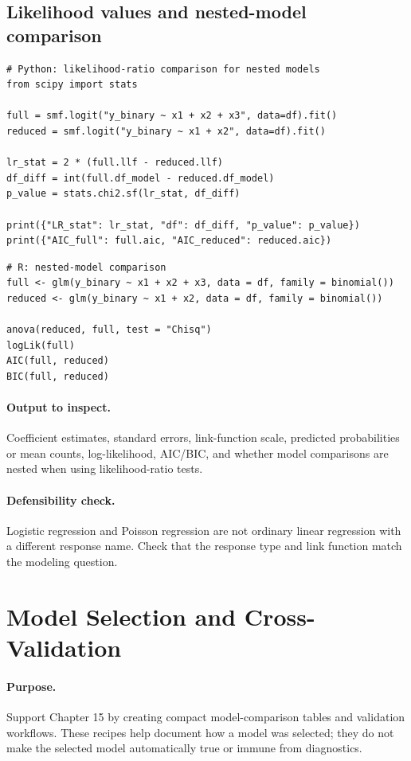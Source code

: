 \subsection*{Likelihood values and nested-model comparison}

\begin{verbatim}
# Python: likelihood-ratio comparison for nested models
from scipy import stats

full = smf.logit("y_binary ~ x1 + x2 + x3", data=df).fit()
reduced = smf.logit("y_binary ~ x1 + x2", data=df).fit()

lr_stat = 2 * (full.llf - reduced.llf)
df_diff = int(full.df_model - reduced.df_model)
p_value = stats.chi2.sf(lr_stat, df_diff)

print({"LR_stat": lr_stat, "df": df_diff, "p_value": p_value})
print({"AIC_full": full.aic, "AIC_reduced": reduced.aic})
\end{verbatim}

\begin{verbatim}
# R: nested-model comparison
full <- glm(y_binary ~ x1 + x2 + x3, data = df, family = binomial())
reduced <- glm(y_binary ~ x1 + x2, data = df, family = binomial())

anova(reduced, full, test = "Chisq")
logLik(full)
AIC(full, reduced)
BIC(full, reduced)
\end{verbatim}

\paragraph{Output to inspect.} Coefficient estimates, standard errors, link-function scale, predicted probabilities or mean counts, log-likelihood, AIC/BIC, and whether model comparisons are nested when using likelihood-ratio tests.

\paragraph{Defensibility check.} Logistic regression and Poisson regression are not ordinary linear regression with a different response name.  Check that the response type and link function match the modeling question.

\section{Model Selection and Cross-Validation}
\label{app:cookbook-model-selection-cross-validation}

\paragraph{Purpose.} Support Chapter 15 by creating compact model-comparison tables and validation workflows.  These recipes help document how a model was selected; they do not make the selected model automatically true or immune from diagnostics.

